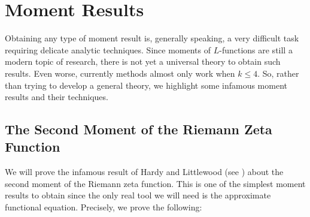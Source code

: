 \chapter{Moment Results}
  Obtaining any type of moment result is, generally speaking, a very difficult task requiring delicate analytic techniques. Since moments of $L$-functions are still a modern topic of research, there is not yet a universal theory to obtain such results. Even worse, currently methods almost only work when $k \le 4$. So, rather than trying to develop a general theory, we highlight some infamous moment results and their techniques.
  \section{The Second Moment of the Riemann Zeta Function}
    We will prove the infamous result of Hardy and Littlewood (see \cite{hardy1916contributions}) about the second moment of the Riemann zeta function. This is one of the simplest moment results to obtain since the only real tool we will need is the approximate functional equation. Precisely, we prove the following:

